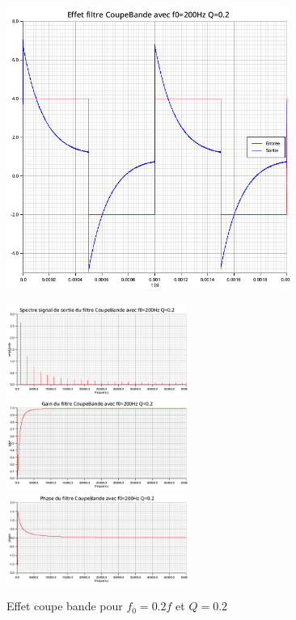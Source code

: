 \documentclass{article}
\begin{document}
\begin{figure}[H]
  \begin{minipage}{0.6\textwidth}
      \centering
      \includegraphics[width=25em]{images/creneau/rejecteur/q=0.2/0.2/signals.png}
  \end{minipage}
  \begin{minipage}{0.3\textwidth}
      \centering
      \includegraphics[width=16em]{images/creneau/rejecteur/q=0.2/0.2/fft_out.png}
      \vfill
      \includegraphics[width=16em]{images/creneau/rejecteur/q=0.2/0.2/gain.png}
      \vfill
      \includegraphics[width=16em]{images/creneau/rejecteur/q=0.2/0.2/phase.png}
  \end{minipage}
  \caption{Effet coupe bande pour $f_0=0.2f$ et $Q=0.2$}
\end{figure}
\end{document}
